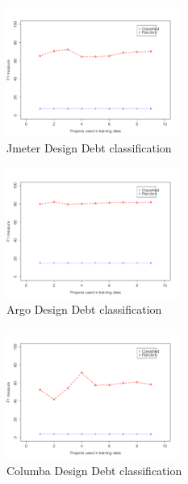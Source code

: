 \begin{figure}[thb!]
  \centering
  \includegraphics[width=0.50\textwidth]{figures/design_jmeter.pdf}
  \vspace{-3mm}
  \caption{Jmeter Design Debt classification}
  \label{fig:design_jmeter}
\end{figure}

\begin{figure}[thb!]
  \centering
  \includegraphics[width=0.50\textwidth]{figures/design_argo.pdf}
  \vspace{-3mm}
  \caption{Argo Design Debt classification}
  \label{fig:design_argo}
\end{figure}

\begin{figure}[thb!]
  \centering
  \includegraphics[width=0.50\textwidth]{figures/design_columba.pdf}
  \vspace{-3mm}
  \caption{Columba Design Debt classification}
  \label{fig:design_columba}
\end{figure}


